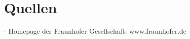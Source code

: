 \documentclass[a4paper]{scrartcl}
\begin{document}






\newpage

\section{Quellen}
\label{sec:quellen}

- Homepage der Fraunhofer Gesellschaft: www.fraunhofer.de
\end{document}
